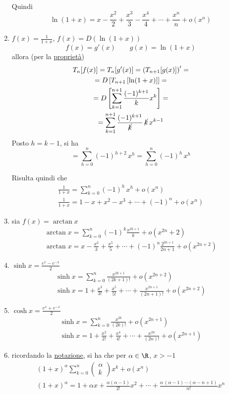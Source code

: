 \begin{enumerate}
\begin{gather*}
    \end{gather*}
    Quindi \[
        \ln(1+x)=x-\frac{x^{2}}{2}+\frac{x^{3}}{3}-\frac{x^{4}}{4}+\cdots+ \frac{x^{n}}{n}+ o(x^n)
    \]
    \item $ f(x)=\frac{1}{1+x} $, $ f(x)=D\left(\ln(1+x)\right) $ \[
        f(x)=g'(x)\qquad g(x)=\ln (1+x)
    \]
    allora (per la \hyperref[proprietaettte]{proprietà})
    \begin{multline*}
        T_{n}[f(x)]=T_{n}[g'(x)]=\left(T_{n+1}[g(x)] \right)'=\\
        = D\left[T_{n+1}\left[\ln (1+x)\right] \right] =\\=
        D\left[\sum_{k=1}^{n+1}\frac{(-1)^{k+1}}{k}x^{k} \right] =\\
        =\sum_{k=1}^{n+1}\frac{(-1)^{k+1}}{\cancel{k}} \, \cancel{k}\,x^{k-1}
    \end{multline*}
    Posto $ h=k-1 $, si ha \[
        =\sum_{h=0}^{n}(-1)^{h+2}\,x^{h}=\sum_{h=0}^{n} (-1)^{h}\,x^{h}  
    \]

    Risulta quindi che \begin{gather*}
        \frac{1}{1+x}=\sum_{k=0}^{n} (-1)^{h}\,x^{h} +o(x^{n})\\
        \frac{1}{1+x}=1-x+x^{2}-x^{3}+\cdots+(-1)^{n}+o(x^{n} )
    \end{gather*}
    \item sia $ f(x)=\arctan x $\begin{gather*}
        \arctan x = \sum_{k=0}^{n} (-1)^{k}\frac{x^{2k+1}}{k}+o(x^{2n}+2)\\
        \arctan x = x-\frac{x^{3}}{3}+\frac{x^{5}}{5}+ \cdots+(-1)^{n}\frac{2^{2n+1}}{2n+1}+o(x^{2n+2})
    \end{gather*}
    \item $ \sinh x = \frac{e^{x}-e^{-x}}{2} $ \begin{gather*}
        \sinh x =\sum_{k=0}^{n}\frac{x^{2k+1}}{(2k+1)!}+o(x^{2n+2})\\
        \sinh x = 1 + \frac{x^{3}}{3!}+\frac{x^{5}}{5!}+\cdots+ \frac{x^{2n+1}}{(2n+1)!}+o(x^{2n+2})
    \end{gather*}
    \item$ \cosh x = \frac{e^{x}+e^{-x}}{2} $ \begin{gather*}
        \sinh x =\sum_{k=0}^{n}\frac{x^{2k}}{(2k)!}+o(x^{2n+1})\\
        \sinh x = 1 + \frac{x^{2}}{2!}+\frac{x^{4}}{4!}+\cdots+ \frac{x^{2n}}{(2n)!}+o(x^{2n+1})
    \end{gather*}
    \item ricordando la \hyperref[binomiale]{notazione}, si ha che per $ \alpha \in \R $, $ x>-1 $ \begin{gather*}
        (1+x)^{\alpha}\sum_{k=0}^{n}  \begin{pmatrix}
            \alpha\\ k
        \end{pmatrix} x^{k} + o(x^{n})\\
        (1+x)^{\alpha}=1+\alpha x + \frac{\alpha(\alpha -1)}{2!}x^{2}+\cdots+ \frac{\alpha\,(\alpha-1)\,\cdots(\alpha-n+1)}{n!}x^{n}
    \end{gather*}


\end{enumerate}
